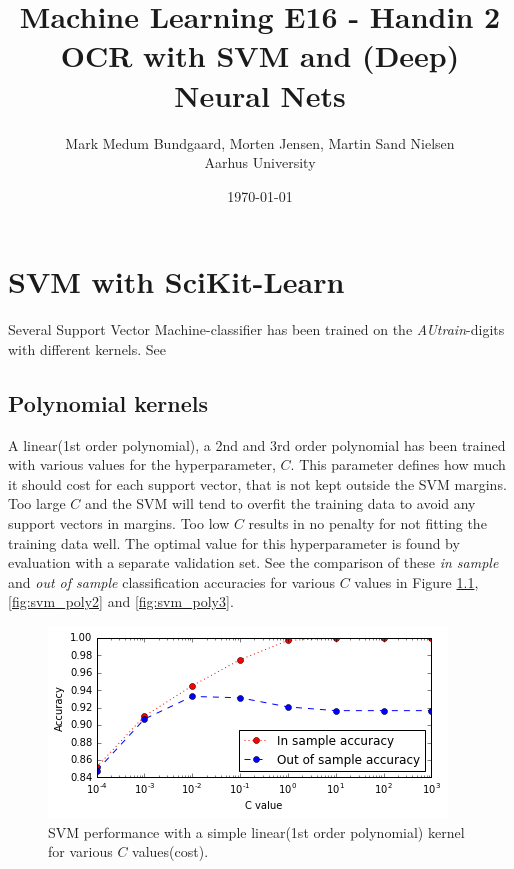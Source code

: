 \documentclass[a4paper,10pt,article,oneside,english]{memoir}
\begin{document}
	\title{Machine Learning E16 - Handin 2\\OCR with SVM and (Deep) Neural Nets}
	\author{Mark Medum Bundgaard, Morten Jensen, Martin Sand Nielsen\\ Aarhus University}
	\date{\today}
	
	\mainmatter
	\maketitle
	
	
	
	
	
	
	
\chapter{SVM with SciKit-Learn}
Several Support Vector Machine-classifier has been trained on the \emph{AUtrain}-digits with different kernels. See 

\section{Polynomial kernels}
A linear(1st order polynomial), a 2nd and 3rd order polynomial has been trained with various values for the hyperparameter, $C$. This parameter defines how much it should cost for each support vector, that is not kept outside the SVM margins. Too large $C$ and the SVM will tend to overfit the training data to avoid any support vectors in margins. Too low $C$ results in no penalty for not fitting the training data well. The optimal value for this hyperparameter is found by evaluation with a separate validation set. See the comparison of these \emph{in sample} and \emph{out of sample} classification accuracies for various $C$ values in Figure \ref{fig:svm_lin}, \ref{fig:svm_poly2} and \ref{fig:svm_poly3}.


\begin{figure}[h!]
	\centering
	\includegraphics[width=0.7\linewidth]{svm_lin.PNG}
	\caption{SVM performance with a simple linear(1st order polynomial) kernel for various $C$  values(cost).}
	\label{fig:svm_lin}
\end{figure}
\end{document}
